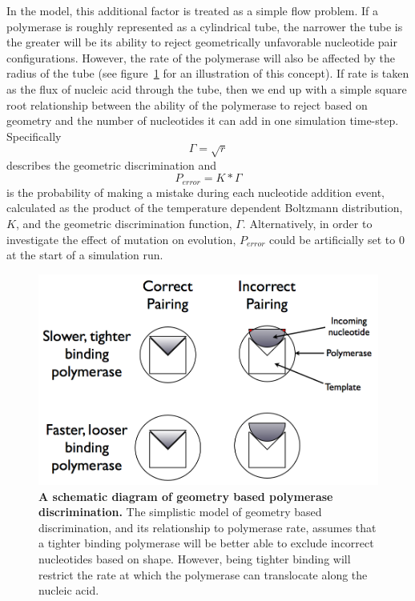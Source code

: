 In the model, this additional factor is treated as a simple flow problem. If a polymerase is roughly represented as a cylindrical tube, the narrower the tube is the greater will be its ability to reject geometrically unfavorable nucleotide pair configurations. However, the rate of the polymerase will also be affected by the radius of the tube (see figure~\ref{fig:schematic} for an illustration of this concept). If rate is taken as the flux of nucleic acid through the tube, then we end up with a simple square root relationship between the ability of the polymerase to reject based on geometry and the number of nucleotides it can add in one simulation time-step. Specifically\[
	\Gamma = \sqrt{r}
\]
describes the geometric discrimination and\[
	P_{error} = K * \Gamma
\]
is the probability of making a mistake during each nucleotide addition event, calculated as the product of the temperature dependent Boltzmann distribution, $K$, and the geometric discrimination function, $\Gamma$. Alternatively, in order to investigate the effect of mutation on evolution, $P_{error}$ could be artificially set to 0 at the start of a simulation run.

\begin{figure}[ht]
	\centering
		\includegraphics[width=\textwidth]{schematic}
	\caption{\textbf{A schematic diagram of geometry based polymerase discrimination.} The simplistic model of geometry based discrimination, and its relationship to polymerase rate, assumes that a tighter binding polymerase will be better able to exclude incorrect nucleotides based on shape. However, being tighter binding will restrict the rate at which the polymerase can translocate along the nucleic acid.}
	\label{fig:schematic}
\end{figure}

